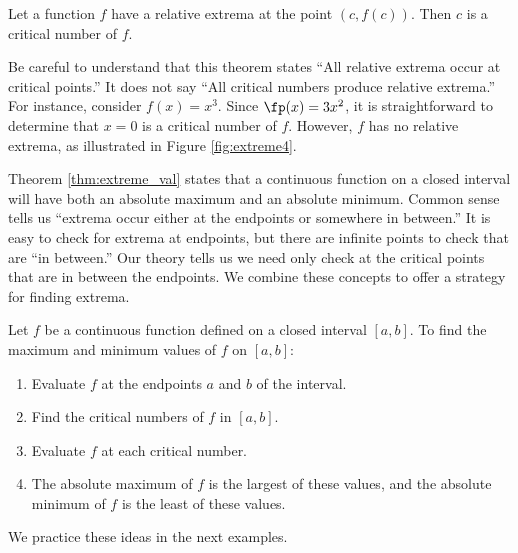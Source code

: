 {Let a function $f$ have a relative extrema at the point $(c,f(c))$. Then $c$ is a critical number of $f$.
}

Be careful to understand that this theorem states  ``All relative extrema occur at critical points.'' It does not say ``All critical numbers produce relative extrema.'' For instance, consider $f(x) = x^3$. Since $\fp(x) = 3x^2$, it is straightforward to determine that $x=0$ is a critical number of $f$. However, $f$ has no relative extrema, as illustrated in Figure \ref{fig:extreme4}. 

Theorem \ref{thm:extreme_val} states that a continuous function on a closed interval will have both an absolute maximum and an absolute minimum. Common sense tells us ``extrema occur either at the endpoints or somewhere in between.'' It is easy to check for extrema at endpoints, but there are infinite points to check that are ``in between.'' Our theory tells us we need only check at the critical points that are in between the endpoints. %
We combine these concepts to offer a strategy for finding extrema.

%
{Let $f$ be a continuous function defined on a closed interval $[a,b]$. To find the maximum and minimum values of $f$ on $[a,b]$:
	\begin{enumerate}
	\item		Evaluate $f$ at the endpoints $a$ and $b$ of the interval.
	\item		Find the critical numbers of $f$ in $[a,b]$.
	\item		Evaluate $f$ at each critical number.
	\item		The absolute maximum of $f$ is the largest of these values, and the absolute minimum of $f$ is the least of these values.
	\end{enumerate}
}

We practice these ideas in the next examples.\\

